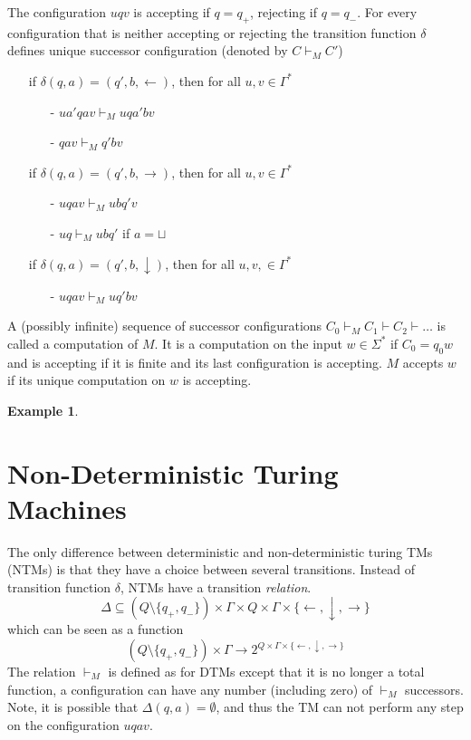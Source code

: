 \documentclass{report}
\newtheorem{example}[definition]{Example}
\begin{document}
The configuration $uqv$ is accepting if $q=q_+$, rejecting if $q=q_-$. For every configuration that is neither accepting or rejecting the transition function $\delta$ defines unique successor configuration (denoted by $C \vdash_M C'$)
\begin{itemize}
\item[if] $\delta(q,a) = (q',b,\leftarrow)$, then for all $u,v \in \Gamma^*$
	\begin{itemize}
		\item[-] $ua'qav \vdash_M uqa'bv$
		\item[-] $qav \vdash_M q'bv$
	\end{itemize}
\item[if] $\delta(q,a) = (q',b,\rightarrow)$, then for all $u,v \in \Gamma^*$
	\begin{itemize}
		\item[-] $uqav \vdash_M ubq'v$
		\item[-] $uq \vdash_M ubq'$ if $a = \sqcup$
	\end{itemize}
\item[if] $\delta(q,a) = (q',b,\downarrow)$, then for all $u,v, \in \Gamma^*$
	\begin{itemize}
		\item[-] $uqav \vdash_M uq'bv$
	\end{itemize}
\end{itemize}
A (possibly infinite) sequence of successor configurations $C_0 \vdash_M C_1 \vdash C_2 \vdash \dots$ is called a computation of $M$. It is a computation on the input $w \in \Sigma^*$ if $C_0 = q_0w$ and is accepting if it is finite and its last configuration is accepting. $M$ accepts $w$ if its unique computation on $w$ is accepting.

\begin{example}
\end{example}

\section{Non-Deterministic Turing Machines}\label{sec:turing-machinges}
The only difference between deterministic and non-deterministic turing TMs (NTMs) is that they have a choice between several transitions. Instead of transition function $\delta$, NTMs have a transition \textit{relation}.
\[\Delta \subseteq (Q \setminus \{q_+,q_-\}) \times \Gamma \times Q \times \Gamma \times \{\leftarrow,\downarrow,\rightarrow\}\]
which can be seen as a function
\[(Q \setminus \{q_+,q_-\}) \times \Gamma \rightarrow 2^{Q\times\Gamma\times\{\leftarrow,\downarrow,\rightarrow\}}\]
The relation $\vdash_M$ is defined as for DTMs except that it is no longer a total function, a configuration can have any number (including zero) of $\vdash_M$ successors. Note, it is possible that $\Delta(q,a) = \emptyset$, and thus the TM can not perform any step on the configuration $uqav$.
\end{document}
